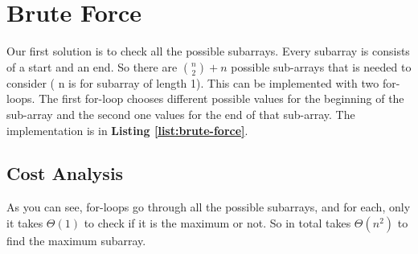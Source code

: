 \section{Brute Force}
Our first solution is to check all the possible 
subarrays. Every subarray is consists of a start 
and an end. So there are $\binom{n}{2} + n $
possible sub-arrays that is needed to consider
( n is for subarray of length 1). 
This can be implemented with two for-loops. The 
first for-loop chooses different possible 
values for the beginning of the sub-array 
and the second one values for the end of 
that sub-array. The implementation is in 
\textbf{Listing \ref{list:brute-force}}.
\subsection{Cost Analysis}
As you can see, for-loops go through all the possible 
subarrays, and for each, only it takes $\Theta(1)$ 
to check if it is the maximum or not. So in total 
takes $\Theta(n^2)$ to find the maximum subarray.
